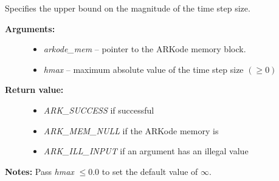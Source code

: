 \documentclass[letterpaper,10pt,english]{sphinxmanual}
\begin{document}
\begin{fulllineitems}
\label{c_interface/User_callable:ARKodeSetMaxStep}
Specifies the upper bound on the magnitude of the time step size.
\begin{description}
\item[{\textbf{Arguments:}}] \leavevmode\begin{itemize}
\item {} 
\emph{arkode\_mem} -- pointer to the ARKode memory block.

\item {} 
\emph{hmax} -- maximum absolute value of the time step size $(\ge 0)$

\end{itemize}

\item[{\textbf{Return value:}}] \leavevmode\begin{itemize}
\item {} 
\emph{ARK\_SUCCESS} if successful

\item {} 
\emph{ARK\_MEM\_NULL} if the ARKode memory is 

\item {} 
\emph{ARK\_ILL\_INPUT} if an argument has an illegal value

\end{itemize}

\end{description}

\textbf{Notes:} Pass \emph{hmax} $\le 0.0$ to set the default value of $\infty$.

\end{fulllineitems}

\end{document}

